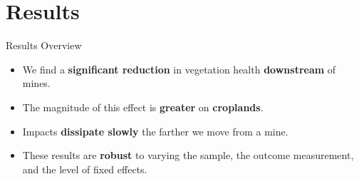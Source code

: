 \documentclass[aspectratio=169,11pt,dvipsnames, handout]{beamer}
\begin{document}

\section{Results}



\begin{frame}{Results Overview}

\begin{itemize}
    \item We find a \textbf{significant reduction} in vegetation health \colorbox{downcol!30}{\bfseries downstream} of mines.

\vspace{1em} 

\item The magnitude of this effect is \textbf{greater} on \textbf{croplands}.

\vspace{1em}

\item Impacts \textbf{dissipate slowly} the farther we move from a mine.

\vspace{1em}

\item These results are \textbf{robust} to varying the sample, the outcome measurement, and the level of fixed effects.

\end{itemize}

\end{frame}

\end{document}
